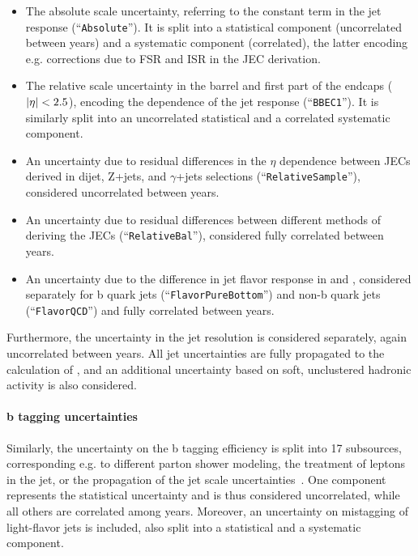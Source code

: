 \begin{itemize}
    \item The absolute scale uncertainty,  referring to the constant term in the jet \pt response (``\texttt{Absolute}''). It is split into a statistical component (uncorrelated between years) and a systematic component (correlated), the latter encoding e.g. corrections due to FSR and ISR in the JEC derivation.
    \item The relative scale uncertainty in the barrel and first part of the endcaps ($|\eta| < 2.5$), encoding the \pt dependence of the jet \pt response (``\texttt{BBEC1}''). It is similarly split into an uncorrelated statistical and a correlated systematic component.
    \item An uncertainty due to residual differences in the $\eta$ dependence between JECs derived in dijet, Z+jets, and $\gamma$+jets selections (``\texttt{RelativeSample}''), considered uncorrelated between years.
    \item An uncertainty due to residual differences between different methods of deriving the JECs (``\texttt{RelativeBal}''), considered fully correlated between years.
    \item An uncertainty due to the difference in jet flavor response in \pythia and \herwig, considered separately for b quark jets (``\texttt{FlavorPureBottom}'') and non-b quark jets (``\texttt{FlavorQCD}'') and fully correlated between years.
\end{itemize}

Furthermore, the uncertainty in the jet \pt resolution is considered separately, again uncorrelated between years. All jet uncertainties are fully propagated to the calculation of \ptmiss, and an additional \ptmiss uncertainty based on soft, unclustered hadronic activity is also considered.

\paragraph{b tagging uncertainties}
Similarly, the uncertainty on the b tagging efficiency is split into 17 subsources, corresponding e.g. to different parton shower modeling, the treatment of leptons in the jet, or the propagation of the jet \pt scale uncertainties~\cite{CMS:BTV-16-002}. One component represents the statistical uncertainty and is thus considered uncorrelated, while all others are correlated among years. Moreover, an uncertainty on mistagging of light-flavor jets is included, also split into a statistical and a systematic component.

